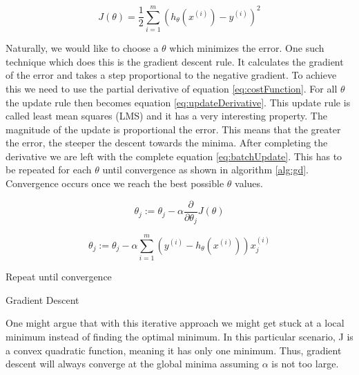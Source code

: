\documentclass{mproj}
\begin{document}
\begin{equation}
\label{eq:costFunction}
J(\theta) = \frac{1}{2}\sum_{i=1}^{m}( h_\theta(x^{(i)})-y^{(i)})^2
\end{equation}

Naturally, we would like to choose a $\theta$ which minimizes the error. One such technique which does this is the gradient descent rule. It calculates the gradient of the error and takes a step proportional to the negative gradient. To achieve this we need to use the partial derivative of equation \ref{eq:costFunction}. For all $\theta$ the update rule then becomes equation \ref{eq:updateDerivative}. This update rule is called least mean squares (LMS) and it has a very interesting property. The magnitude of the update is proportional the error. This means that the greater the error, the steeper the descent towards the minima.  After completing the derivative we are left with the complete equation \ref{eq:batchUpdate}. This has to be repeated for each $\theta$ until convergence as shown in algorithm \ref{alg:gd}. Convergence occurs once we reach the best possible $\theta$ values.

\begin{equation}
\label{eq:updateDerivative}
\theta_j := \theta_j - \alpha\frac{\partial}{\partial\theta_j}J(\theta)
\end{equation}

\begin{equation}
\label{eq:batchUpdate}
\theta_j := \theta_j - \alpha\sum_{i=1}^{m}(y^{(i)}-h_\theta(x^{(i)}))x_j^{(i)}
\end{equation}

\begin{algorithm}[H]
Repeat until convergence\;
\caption{Gradient Descent}
\label{alg:gd}
\end{algorithm}

One might argue that with this iterative approach we might get stuck at a local minimum instead of finding the optimal minimum. In this particular scenario, J is a convex quadratic function, meaning it has only one minimum. Thus, gradient descent will always converge at the global minima assuming $\alpha$ is not too large.
\end{document}
